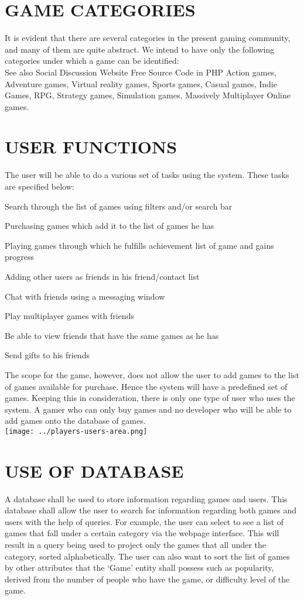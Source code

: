 \documentclass{article}
\begin{document}
 \section{GAME CATEGORIES}
 It is evident that there are several categories in the present gaming community, and many of them are quite abstract. We intend to have only the following categories under which a game can be identified:\\

See also  Social Discussion Website Free Source Code in PHP
Action games, Adventure games, Virtual reality games, Sports games, Casual games, Indie Games, RPG, Strategy games, Simulation games, Massively Multiplayer Online games.\\
 \section{USER FUNCTIONS}
 The user will be able to do a various set of tasks using the system. These tasks are specified below:

Search through the list of games using filters and/or search bar

Purchasing games which add it to the list of games he has

Playing games through which he fulfills achievement list of game and gains progress

Adding other users as friends in his friend/contact list

Chat with friends using a messaging window

Play multiplayer games with friends

Be able to view friends that have the same games as he has

Send gifts to his friends

The scope for the game, however, does not allow the user to add games to the list of games available for purchase. Hence the system will have a predefined set of games. Keeping this in consideration, there is only one type of user who uses the system. A gamer who can only buy games and no developer who will be able to add games onto the database of games.\\

\texttt{[image: ../players-users-area.png]} \\
 \section{USE OF DATABASE}
 A database shall be used to store information regarding games and users. This database shall allow the user to search for information regarding both games and users with the help of queries. For example, the user can select to see a list of games that fall under a certain category via the webpage interface. This will result in a query being used to project only the games that all under the category, sorted alphabetically. The user can also want to sort the list of games by other attributes that the ‘Game’ entity shall possess such as popularity, derived from the number of people who have the game, or difficulty level of the game.
\end{document}
